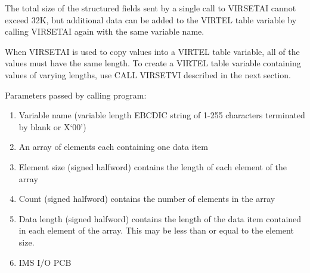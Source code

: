 \documentclass[letterpaper,10pt,english]{sphinxmanual}
\begin{document}
The total size of the structured fields sent by a single call to VIRSETAI cannot exceed 32K, but additional data can be
added to the VIRTEL table variable by calling VIRSETAI again with the same variable name.

When VIRSETAI is used to copy values into a VIRTEL table variable, all of the values must have the same length. To
create a VIRTEL table variable containing values of varying lengths, use CALL VIRSETVI described in the next section.


Parameters passed by calling program:
\begin{enumerate}
\item {} 
Variable name (variable length EBCDIC string of 1-255 characters terminated by blank or X‘00’)

\item {} 
An array of elements each containing one data item

\item {} 
Element size (signed halfword) contains the length of each element of the array

\item {} 
Count (signed halfword) contains the number of elements in the array

\item {} 
Data length (signed halfword) contains the length of the data item contained in each element of the array. This may be less than or equal to the element size.

\item {} 
IMS I/O PCB

\end{enumerate}

\end{document}
